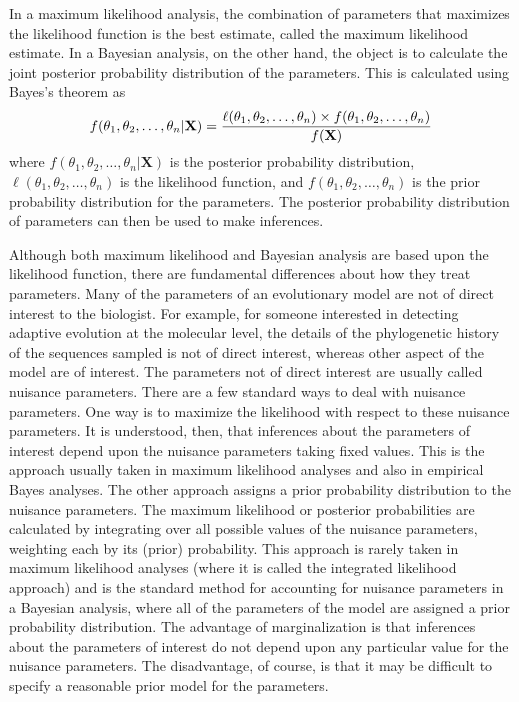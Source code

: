 \documentclass{svmult}
\begin{document}
In a maximum likelihood analysis, the combination of parameters that maximizes the likelihood
function is the best estimate, called the maximum likelihood estimate. In a Bayesian analysis, on
the other hand, the object is to calculate the joint posterior probability distribution of the
parameters. This is calculated using Bayes's theorem as
$$
f(\theta_1, \theta_2, \ldots, \theta_n | \mathbf{X}) = {\ell(\theta_1, \theta_2, \ldots, \theta_n) 
\times f(\theta_1, \theta_2, \ldots, \theta_n) \over f(\mathbf{X}) }
$$
where $f(\theta_1, \theta_2, \ldots, \theta_n | \mathbf{X})$ is the posterior probability
distribution, $\ell(\theta_1, \theta_2, \ldots, \theta_n)$ is the likelihood function, and
$f(\theta_1, \theta_2, \ldots, \theta_n)$ is the prior probability distribution for the parameters.
The posterior probability distribution of parameters can then be used to make inferences.

Although both maximum likelihood and Bayesian analysis are based upon the likelihood function,
there are fundamental differences about how they treat parameters.  Many of the parameters of an
evolutionary model are not of direct interest to the biologist.  For example, for someone
interested in detecting adaptive evolution at the molecular level, the details of the phylogenetic
history of the sequences sampled is not of direct interest, whereas other aspect of the model are
of interest. The parameters not of direct interest are usually called nuisance parameters. There
are a few standard ways to deal with nuisance parameters. One way is to maximize the likelihood
with respect to these nuisance parameters. It is understood, then, that inferences about the
parameters of interest depend upon the nuisance parameters taking fixed values. This is the
approach usually taken in maximum likelihood analyses and also in empirical Bayes analyses. The
other approach assigns a prior probability distribution to the nuisance parameters. The maximum
likelihood or posterior probabilities are calculated by integrating over all possible values of the
nuisance parameters, weighting each by its (prior) probability. This approach is rarely taken in
maximum likelihood analyses (where it is called the integrated likelihood approach) and is the
standard method for accounting for nuisance parameters in a Bayesian analysis, where all of the
parameters of the model are assigned a prior probability distribution.  The advantage of
marginalization is that inferences about the parameters of interest do not depend upon any
particular value for the nuisance parameters. The disadvantage, of course, is that it may be
difficult to specify a reasonable prior model for the parameters.
\end{document}
